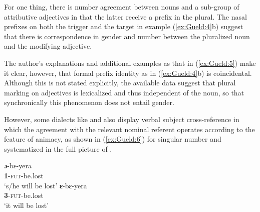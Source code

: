\documentclass[output=collectionpaper]{langsci/langscibook}
\begin{document}
For one thing, there is number agreement between nouns and a sub-group of attributive adjectives in that the latter receive a prefix in the plural. The nasal prefixes on both the trigger and the target in example (\ref{ex:Gueld:4}b) suggest that there is correspondence in gender and number between the pluralized noun and the modifying adjective.

%

The author's explanations and additional examples as that in (\ref{ex:Gueld:5}) make it clear, however, that formal prefix identity as in (\ref{ex:Gueld:4}b) is coincidental. Although this is not stated explicitly, the available data suggest that plural marking on adjectives is lexicalized and thus independent of the noun, so that synchronically this phenomenon does not entail gender.

%

However, some  dialects like  and  also display verbal subject cross-reference in which the agreement with the relevant nominal referent operates according to the feature of animacy, as shown in (\ref{ex:Gueld:6}) for singular number and systematized in the full picture of .

\ea
\label{ex:Gueld:6}
\begin{xlist}
\ex
\gll \textbf{ɔ}{}-bɛ-yera\\
     \textbf{\textsc{1}}\textsc{{}-fut}{}-be.lost\\
\glt `s/he will be lost'
\ex
\gll \textbf{ɛ}{}-bɛ-yera\\
     \textbf{\textsc{3}}\textsc{{}-fut}{}-be.lost\\
\glt `it will be lost'
\end{xlist}
\z
\end{document}
